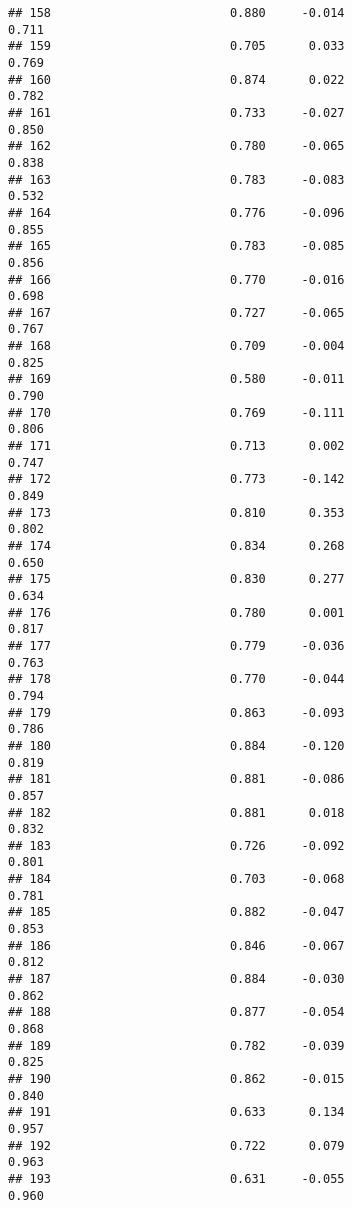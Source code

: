 \documentclass[
]{article}
\begin{document}
\begin{verbatim}
## 158                         0.880     -0.014                     0.711
## 159                         0.705      0.033                     0.769
## 160                         0.874      0.022                     0.782
## 161                         0.733     -0.027                     0.850
## 162                         0.780     -0.065                     0.838
## 163                         0.783     -0.083                     0.532
## 164                         0.776     -0.096                     0.855
## 165                         0.783     -0.085                     0.856
## 166                         0.770     -0.016                     0.698
## 167                         0.727     -0.065                     0.767
## 168                         0.709     -0.004                     0.825
## 169                         0.580     -0.011                     0.790
## 170                         0.769     -0.111                     0.806
## 171                         0.713      0.002                     0.747
## 172                         0.773     -0.142                     0.849
## 173                         0.810      0.353                     0.802
## 174                         0.834      0.268                     0.650
## 175                         0.830      0.277                     0.634
## 176                         0.780      0.001                     0.817
## 177                         0.779     -0.036                     0.763
## 178                         0.770     -0.044                     0.794
## 179                         0.863     -0.093                     0.786
## 180                         0.884     -0.120                     0.819
## 181                         0.881     -0.086                     0.857
## 182                         0.881      0.018                     0.832
## 183                         0.726     -0.092                     0.801
## 184                         0.703     -0.068                     0.781
## 185                         0.882     -0.047                     0.853
## 186                         0.846     -0.067                     0.812
## 187                         0.884     -0.030                     0.862
## 188                         0.877     -0.054                     0.868
## 189                         0.782     -0.039                     0.825
## 190                         0.862     -0.015                     0.840
## 191                         0.633      0.134                     0.957
## 192                         0.722      0.079                     0.963
## 193                         0.631     -0.055                     0.960

\end{verbatim}
\end{document}
